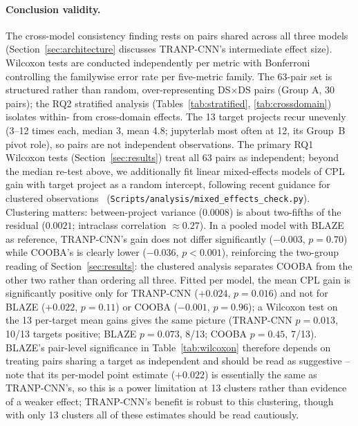\documentclass[a4paper,fleqn]{cas-dc}
\begin{document}
\paragraph{Conclusion validity.}
The cross-model consistency finding rests on pairs shared across all three
models (Section~\ref{sec:architecture} discusses TRANP-CNN's intermediate
effect size). Wilcoxon tests are conducted independently per metric with
Bonferroni controlling the familywise error rate per five-metric family. The
63-pair set is structured rather than random, over-representing
DS$\times$DS pairs (Group A, 30 pairs); the RQ2 stratified analysis
(Tables~\ref{tab:stratified}, \ref{tab:crossdomain}) isolates within- from
cross-domain effects. The 13 target projects recur unevenly (3--12 times
each, median 3, mean 4.8; jupyterlab most often at 12, its Group~B pivot
role), so pairs are not independent observations. The primary RQ1 Wilcoxon
tests (Section~\ref{sec:results}) treat all 63 pairs as independent; beyond the median
re-test above, we additionally fit linear mixed-effects models of CPL gain with target
project as a random intercept, following recent guidance
for clustered observations~\citep{oliveira2019evolution}
(\texttt{Scripts/analysis/mixed\_effects\_check.py}). Clustering matters:
between-project variance ($0.0008$) is about two-fifths of the residual
($0.0021$; intraclass correlation $\approx 0.27$). In a pooled model with
BLAZE as reference, TRANP-CNN's gain does not differ significantly
($-0.003$, $p = 0.70$) while COOBA's is clearly lower ($-0.036$,
$p < 0.001$), reinforcing the two-group reading of
Section~\ref{sec:results}: the clustered analysis separates COOBA from the
other two rather than ordering all three. Fitted
per model, the mean CPL gain is significantly positive only for TRANP-CNN
($+0.024$, $p = 0.016$) and not for BLAZE ($+0.022$, $p = 0.11$) or COOBA
($-0.001$, $p = 0.96$); a Wilcoxon test on the 13 per-target mean gains gives
the same picture (TRANP-CNN $p = 0.013$, 10/13 targets positive; BLAZE
$p = 0.073$, 8/13; COOBA $p = 0.45$, 7/13). BLAZE's pair-level significance in
Table~\ref{tab:wilcoxon} therefore depends on treating pairs sharing a target
as independent and should be read as suggestive -- note that its per-model
point estimate ($+0.022$) is essentially the same as TRANP-CNN's, so this is a
power limitation at 13 clusters rather than evidence of a weaker effect;
TRANP-CNN's benefit is
robust to this clustering, though with only 13 clusters all of these
estimates should be read cautiously.

\end{document}
